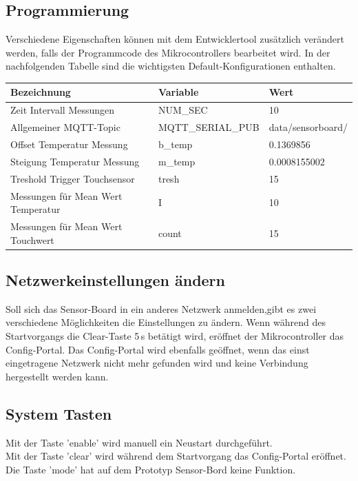 \subsection{Programmierung}
Verschiedene Eigenschaften können mit dem Entwicklertool zusätzlich verändert werden, falls der Programmcode des Mikrocontrollers bearbeitet wird. In der nachfolgenden Tabelle sind die wichtigsten Default-Konfigurationen enthalten.
\begin{table}[H]
	\centering
	\begin{tabular}{|l|l|l|}
		\hline 
		Bezeichnung & Variable & Wert \\ 
		\hline 
		Zeit Intervall Messungen & NUM\_SEC & 10 \\ 
		\hline 
		Allgemeiner MQTT-Topic  & MQTT\_SERIAL\_PUB& data/sensorboard/ \\ 
		\hline 
		Offset Temperatur Messung & b\_temp & 0.1369856 \\ 
		\hline  
		Steigung Temperatur Messung & m\_temp & 0.0008155002 \\ 
		\hline  
		Treshold Trigger Touchsensor & tresh& 15 \\ 
		\hline
		Messungen für Mean Wert Temperatur & I & 10 \\ 
		\hline  
		Messungen für Mean Wert Touchwert & count & 15 \\ 
		\hline  
	\end{tabular} 	
\end{table}
\subsection{Netzwerkeinstellungen ändern}
Soll sich das Sensor-Board in ein anderes Netzwerk anmelden,gibt es zwei verschiedene Möglichkeiten die Einstellungen zu ändern. Wenn während des Startvorgangs die Clear-Taste 5\,s betätigt wird, eröffnet der Mikrocontroller das Config-Portal. Das Config-Portal wird ebenfalls geöffnet, wenn das einst eingetragene Netzwerk nicht mehr gefunden wird und keine Verbindung hergestellt werden kann.
\subsection{System Tasten}
Mit der Taste 'enable' wird manuell ein Neustart durchgeführt. \\
Mit der Taste 'clear' wird während dem Startvorgang das Config-Portal eröffnet. \\
Die Taste 'mode' hat auf dem Prototyp Sensor-Bord keine Funktion.
